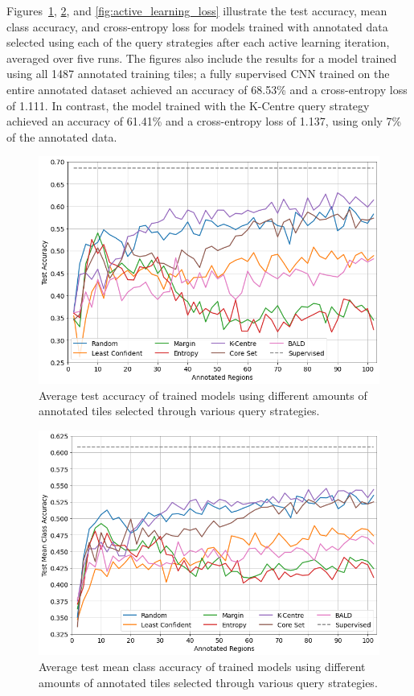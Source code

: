 Figures~\ref{fig:active_learning_accuracy}, \ref{fig:active_learning_mean_class_accuracy}, and \ref{fig:active_learning_loss} illustrate the test accuracy, mean class accuracy, and cross-entropy loss for models trained with annotated data selected using each of the query strategies after each active learning iteration, averaged over five runs. The figures also include the results for a model trained using all 1487 annotated training tiles; a fully supervised CNN trained on the entire annotated dataset achieved an accuracy of 68.53\% and a cross-entropy loss of 1.111. In contrast, the model trained with the K-Centre query strategy achieved an accuracy of 61.41\% and a cross-entropy loss of 1.137, using only 7\% of the annotated data.

\begin{figure}
	\centering
	\includegraphics[width=\textwidth]{images/active_learning_accuracy.png}
	\caption{Average test accuracy of trained models using different amounts of annotated tiles selected through various query strategies.}
	\label{fig:active_learning_accuracy}
\end{figure}

\begin{figure}
	\centering
	\includegraphics[width=\textwidth]{images/active_learning_mean_class_accuracy.png}
	\caption{Average test mean class accuracy of trained models using different amounts of annotated tiles selected through various query strategies.}
	\label{fig:active_learning_mean_class_accuracy}
\end{figure}


